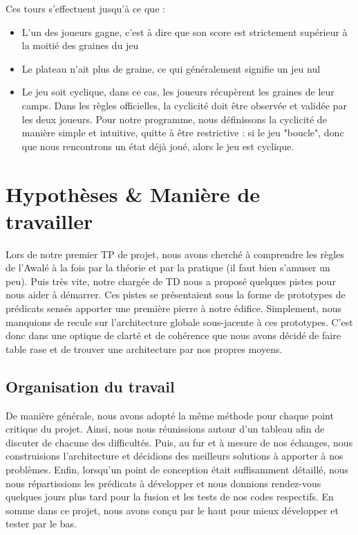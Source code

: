 \documentclass[]{article}
\begin{document}
Ces tours s'effectuent jusqu'à ce que :
\begin{itemize}
\item L'un des joueurs gagne, c'est à dire que son score est strictement supérieur à la moitié des graines du jeu
\item Le plateau n'ait plus de graine, ce qui généralement signifie un jeu nul
\item Le jeu soit cyclique, dans ce cas, les joueurs récupèrent les graines de leur camps. Dans les règles officielles, la cyclicité doit être observée et validée par les deux joueurs. Pour notre programme, nous définissons la cyclicité de manière simple et intuitive, quitte à être restrictive : si le jeu "boucle", donc que nous rencontrons un état déjà joué, alors le jeu est cyclique.
\end{itemize}



\section{Hypothèses \& Manière de travailler}

	Lors de notre premier TP de projet, nous avons cherché à comprendre les règles de l'Awalé à la fois par la théorie et par la pratique (il faut bien s'amuser un peu).
Puis très vite, notre chargée de TD nous a proposé quelques pistes pour nous aider à démarrer. Ces pistes se présentaient sous la forme de prototypes de prédicats sensés apporter une première pierre à notre édifice.
Simplement, nous manquions de recule sur l'architecture globale sous-jacente à ces prototypes. C'est donc dans une optique de clarté et de cohérence que nous avons décidé de faire table rase et de trouver une architecture par nos propres moyens.

\subsection{Organisation du travail}

	De manière générale, nous avons adopté la même méthode pour chaque point critique du projet.
Ainsi, nous nous réunissions autour d'un tableau afin de discuter de chacune des difficultés. Puis, au fur et à mesure de nos échanges, nous construisions l'architecture et décidions des meilleurs solutions à apporter à nos problèmes.
Enfin, lorsqu'un point de conception était suffisamment détaillé, nous nous répartissions les prédicats à développer et nous donnions rendez-vous quelques jours plus tard pour la fusion et les tests de nos codes respectifs.
En somme dans ce projet, nous avons conçu par le haut pour mieux développer et tester par le bas.
\end{document}
